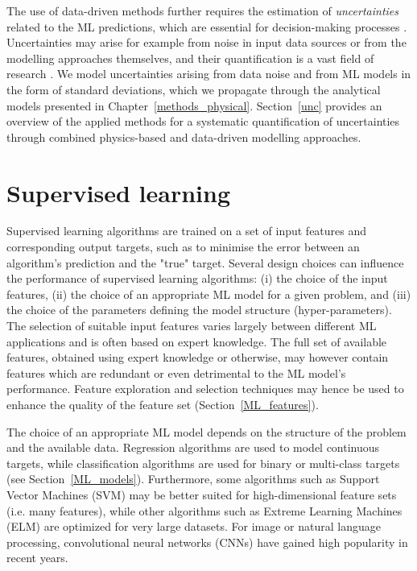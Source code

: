 The use of data-driven methods further requires the estimation of \textit{uncertainties} related to the ML predictions, which are essential for decision-making processes \cite{knusel_argument-based_2020}. 
Uncertainties may arise for example from noise in input data sources or from the modelling approaches themselves, and their quantification is a vast field of research \cite{willard_integrating_2020,knusel_argument-based_2020}.
We model uncertainties arising from data noise and from ML models in the form of standard deviations, which we propagate through the analytical models presented in Chapter~\ref{methods_physical}. 
Section~\ref{unc} provides an overview of the applied methods for a systematic quantification of uncertainties through combined physics-based and data-driven modelling approaches. 

\section{Supervised learning}
\label{ML_supervised}

Supervised learning algorithms are trained on a set of input features and corresponding output targets, such as to minimise the error between an algorithm's prediction and the "true" target.
Several design choices can influence the performance of supervised learning algorithms: (i) the choice of the input features, (ii) the choice of an appropriate ML model for a given problem, and (iii) the
choice of the parameters defining the model structure (hyper-parameters).
The selection of suitable input features varies largely between different ML applications and is often based on expert knowledge. 
The full set of available features, obtained using expert knowledge or otherwise, may however contain features which are redundant or even detrimental to the ML model's performance.
Feature exploration and selection techniques may hence be used to enhance the quality of the feature set (Section~\ref{ML_features}).

The choice of an appropriate ML model depends on the structure of the problem and the available data. Regression algorithms are used to model continuous targets, while classification algorithms are used for binary or multi-class targets (see Section~\ref{ML_models}). Furthermore, some algorithms such as Support Vector Machines (SVM) may be better suited for high-dimensional feature sets (i.e. many features), while other algorithms such as Extreme Learning Machines (ELM) are optimized for very large datasets. For image or natural language processing, convolutional neural networks (CNNs) have gained high popularity in recent years.

